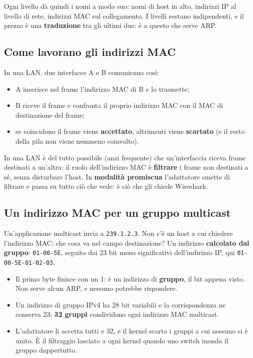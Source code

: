 Ogni livello dà quindi i nomi a modo suo: nomi di host in alto, indirizzi IP al livello di rete, indirizzi MAC sul collegamento. I
livelli restano indipendenti, e il prezzo è una \textbf{traduzione} tra gli ultimi due: è a questo che serve ARP.

\subsection{Come lavorano gli indirizzi MAC}

In una LAN, due interfacce A e B comunicano così:

\begin{itemize}
    \item A inserisce nel frame l'indirizzo MAC di B e lo trasmette;
    \item B riceve il frame e confronta il proprio indirizzo MAC con il MAC di destinazione del frame;
    \item se coincidono il frame viene \textbf{accettato}, altrimenti viene \textbf{scartato} (e il resto della pila non viene nemmeno coinvolto).
\end{itemize}


In una LAN è del tutto possibile (anzi frequente) che un'interfaccia riceva frame destinati a un'altra: il ruolo dell'indirizzo MAC è
\textbf{filtrare} i frame non destinati a sé, senza disturbare l'host. In \textbf{modalità promiscua} l'adattatore smette di filtrare e
passa su tutto ciò che vede: è ciò che gli chiede Wireshark.

\subsection{Un indirizzo MAC per un gruppo multicast}

Un'applicazione multicast invia a \texttt{239.1.2.3}. Non c'è un host a cui chiedere l'indirizzo MAC: che cosa va nel campo
destinazione? Un indirizzo \textbf{calcolato dal gruppo}: \texttt{01-00-5E}, seguito dai 23 bit meno significativi dell'indirizzo IP,
qui \texttt{01-00-5E-01-02-03}.

\begin{itemize}
    \item Il primo byte finisce con un 1: è un indirizzo di \textbf{gruppo}, il bit appena visto. Non serve alcun ARP, e nessuno
          potrebbe rispondere.
    \item Un indirizzo di gruppo IPv4 ha 28 bit variabili e la corrispondenza ne conserva 23: \textbf{32 gruppi} condividono ogni
          indirizzo MAC multicast.
    \item L'adattatore li accetta tutti e 32, e il kernel scarta i gruppi a cui nessuno si è unito. È il filtraggio lasciato a ogni
          kernel quando uno switch inonda il gruppo dappertutto.
\end{itemize}

